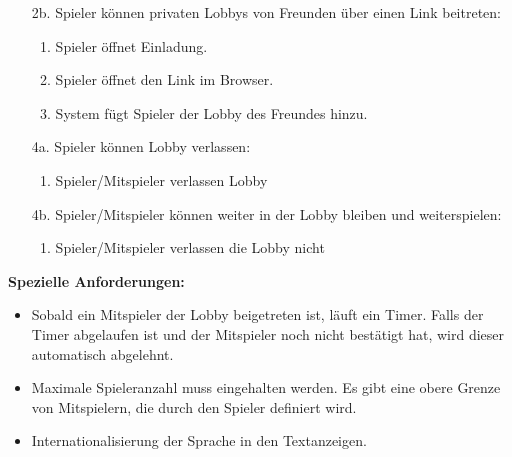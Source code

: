 \documentclass[11pt,ngerman]{article}
\begin{document}
\begin{tcolorbox}
\begin{itemize}
\begin{enumerate}
                    \end{enumerate}
                    \item[2b.] Spieler können privaten \Glspl{Lobby} von Freunden über einen Link beitreten:
                    \begin{enumerate}
                        \item Spieler öffnet Einladung.
                        \item Spieler öffnet den Link im Browser.
                        \item System fügt Spieler der \Gls{Lobby} des Freundes hinzu.
                    \end{enumerate}
                    \item[4a.] Spieler können \Gls{Lobby} verlassen:
                    \begin{enumerate}
                        \item Spieler/Mitspieler verlassen \Gls{Lobby}
                    \end{enumerate}
                    \item[4b.] Spieler/Mitspieler können weiter in der \Gls{Lobby} bleiben und weiterspielen:
                    \begin{enumerate}
                        \item Spieler/Mitspieler verlassen die \Gls{Lobby} nicht
                    \end{enumerate}
                \end{itemize}
                \textbf{Spezielle Anforderungen:}
                \begin{itemize}
                    \item Sobald ein Mitspieler der \Gls{Lobby} beigetreten ist, läuft ein Timer. Falls der Timer abgelaufen ist und der Mitspieler noch nicht bestätigt hat, wird dieser automatisch abgelehnt.
                    \item Maximale Spieleranzahl muss eingehalten werden. Es gibt eine obere Grenze von Mitspielern, die durch den Spieler definiert wird.
                    \item Internationalisierung der Sprache in den Textanzeigen.
                \end{itemize}

            \end{tcolorbox}
\end{document}
